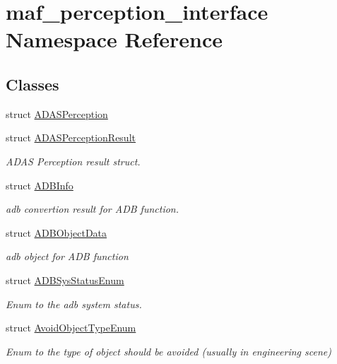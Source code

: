 \hypertarget{namespacemaf__perception__interface}{}\section{maf\+\_\+perception\+\_\+interface Namespace Reference}
\label{namespacemaf__perception__interface}
\subsection*{Classes}
\begin{DoxyCompactItemize}
\item 
struct \hyperlink{structmaf__perception__interface_1_1ADASPerception}{A\+D\+A\+S\+Perception}
\item 
struct \hyperlink{structmaf__perception__interface_1_1ADASPerceptionResult}{A\+D\+A\+S\+Perception\+Result}
\begin{DoxyCompactList}\small\item\em A\+D\+AS Perception result struct. \end{DoxyCompactList}\item 
struct \hyperlink{structmaf__perception__interface_1_1ADBInfo}{A\+D\+B\+Info}
\begin{DoxyCompactList}\small\item\em adb convertion result for A\+DB function. \end{DoxyCompactList}\item 
struct \hyperlink{structmaf__perception__interface_1_1ADBObjectData}{A\+D\+B\+Object\+Data}
\begin{DoxyCompactList}\small\item\em adb object for A\+DB function \end{DoxyCompactList}\item 
struct \hyperlink{structmaf__perception__interface_1_1ADBSysStatusEnum}{A\+D\+B\+Sys\+Status\+Enum}
\begin{DoxyCompactList}\small\item\em Enum to the adb system status. \end{DoxyCompactList}\item 
struct \hyperlink{structmaf__perception__interface_1_1AvoidObjectTypeEnum}{Avoid\+Object\+Type\+Enum}
\begin{DoxyCompactList}\small\item\em Enum to the type of object should be avoided (usually in engineering scene) \end{DoxyCompactList}\item 

\end{DoxyCompactItemize}
